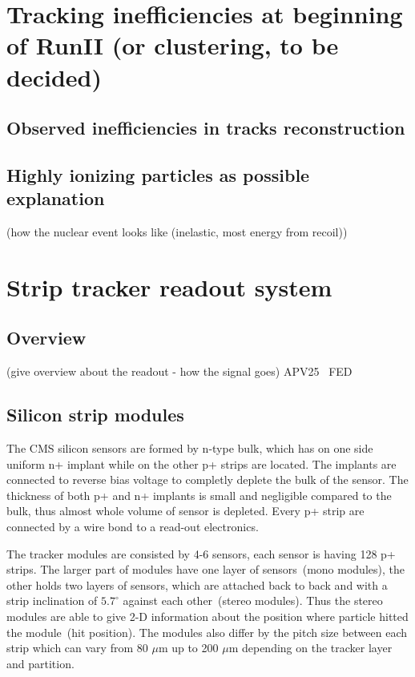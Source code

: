 
\section{Tracking inefficiencies at beginning of RunII (or clustering, to be decided)}

\subsection{Observed inefficiencies in tracks reconstruction}
\subsection{Highly ionizing particles as possible explanation}
        (how the nuclear event looks like (inelastic, most energy from recoil))


\section{Strip tracker readout system}

\subsection{Overview}
       (give overview about the readout - how the signal goes)
APV25~\cite{French:2001xb}
FED~\cite{Baird:2002wg}
\subsection{Silicon strip modules}

The CMS silicon sensors are formed by n-type bulk, which has on one side uniform n+ implant while on the other p+ strips are located. The implants are connected to reverse bias voltage to completly deplete the bulk of the sensor. The thickness of both p+ and n+ implants is small and negligible compared to the bulk, thus almost whole volume of sensor is depleted. Every p+ strip are connected by a wire bond to a read-out electronics.

The tracker modules are consisted by 4-6 sensors, each sensor is having 128 p+ strips. The larger part of modules have one layer of sensors~(mono modules), the other holds two layers of sensors, which are attached back to back and with a strip inclination of $5.7^{\circ}$ against each other~(stereo modules). Thus the stereo modules are able to give 2-D information about the position where particle hitted the module~(hit position). The modules also differ by the pitch size between each strip which can vary from 80 $\mu$m up to 200 $\mu$m depending on the tracker layer and partition.

